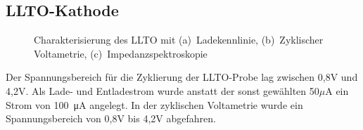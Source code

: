 \documentclass[a4paper, 11pt, headsepline,footsepline,twoside,abstract]{scrbook}
\begin{document}
\subsection{LLTO-Kathode}
\begin{figure}
   \centering
       \vspace{3mm}
       \vspace{3mm}
       \vspace{3mm}
	\caption{Charakterisierung des LLTO mit (a)~Ladekennlinie, (b)~Zyklischer Voltametrie, (c)~Impedanzspektroskopie}
   	\label{ec_LLTO}
\end{figure}
Der Spannungsbereich für die Zyklierung der LLTO-Probe lag zwischen 0,8V und 4,2V. Als Lade- und Entladestrom wurde anstatt der sonst gewählten 50$\mu$A ein Strom von \SI{100}{\micro\ampere} angelegt. In der zyklischen Voltametrie wurde ein Spannungsbereich von 0,8V bis 4,2V abgefahren.
\end{document}
